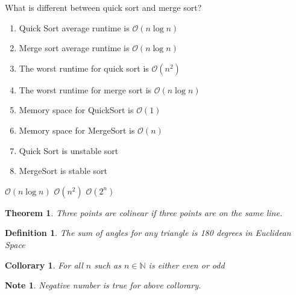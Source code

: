 \documentclass{article}
\newtheorem{theorem}{Theorem}
\newtheorem{defintion}{Definition}
\newtheorem{collorary}{Collorary}
\newtheorem{note}{Note}
\begin{document}
\pagebreak
What is different between quick sort and merge sort? 
\begin{enumerate}
\item Quick Sort average runtime is $\mathcal{O}(n\log{}n)$  
\item Merge sort average runtime is $\mathcal{O}(n\log{}n)$  
\item The worst runtime for quick sort is $\mathcal{O}(n^2)$  
\item The worst runtime for merge sort is $\mathcal{O}(n\log{}n)$ 
\item Memory space for QuickSort is $\mathcal{O}(1)$ 
\item Memory space for MergeSort is $\mathcal{O}(n)$
\item Quick Sort is unstable sort
\item MergeSort is stable sort
\end{enumerate} 


$\mathcal{O}(n\log{}n)$
$\mathcal{O}(n^2)$
$\mathcal{O}(2^n)$ 

\begin{theorem}
Three points are colinear if three points are on the same line.
\end{theorem}

\begin{defintion}
The sum of angles for any triangle is 180 degrees in Euclidean Space
\end{defintion}

\begin{collorary}
For all $n$ such as $n \in \mathbb{N}$ is either even or odd
\end{collorary}



\begin{note}
Negative number is true for above collorary.
\end{note}
\end{document}

